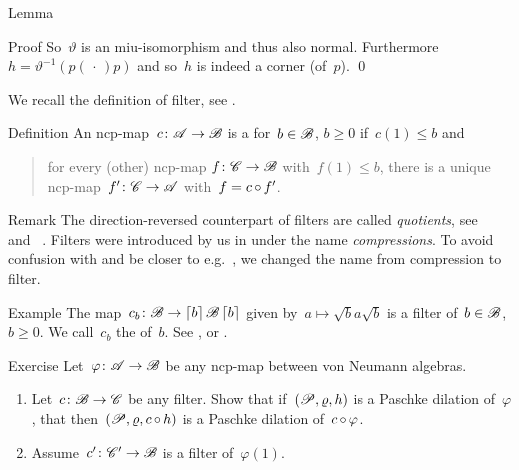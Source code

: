 \documentclass[b]{subfiles}
\begin{document}
\begin{parsec}
\begin{point}{Lemma}
\begin{point}{Proof}
So~$\vartheta$ is an miu-isomorphism and thus also normal.
    Furthermore~$h = \vartheta^{-1}(p (\,\cdot\,) p)$
     and so~$h$ is indeed a corner (of~$p$). \qed
\end{point}
\end{point}
\begin{point}%
We recall the definition of filter, see . 
\end{point}
\begin{point}{Definition}%
An ncp-map~$c \colon \mathscr{A} \to \mathscr{B}$
is a  for~$b \in\mathscr{B}$, $b \geq 0$ if~$c(1)\leq b$
    and
    \begin{quote}
        for every (other) ncp-map $f\colon \mathscr{C} \to \mathscr{B}$
            with~$f(1) \leq b$,
            there is a unique ncp-map~$f'\colon \mathscr{C} \to \mathscr{A}$
            with~$f = c \mathop{\circ} f'$.
    \end{quote}
\begin{point}{Remark}%
The direction-reversed counterpart
    of filters are called \emph{quotients},
    see~ and~\cite{effintro} .
Filters were introduced by us in \cite[Dfn.~2]{westerbaan2016universal}
    under the name \emph{compressions}.
To avoid confusion with \cite{alfsen2012}
    and be closer to e.g.~\cite{wilce2016royal},
    we changed the name from compression to filter.
\end{point}
\end{point}
\begin{point}{Example}%
    The map~$c_b\colon \mathscr{B} \to \left\lceil b\right\rceil \mathscr{B} \left\lceil b\right\rceil$
        given by~$a \mapsto \sqrt{b} a \sqrt{b}$ is a filter
        of~$b\in \mathscr{B}$, $b\geq 0$.
        We call~$c_b$ the  of~$b$.
    See , 
        or \cite[Prop.~6]{westerbaan2016universal}.
\end{point}
\begin{point}{Exercise}%
Let~$\varphi\colon \mathscr{A} \to \mathscr{B}$ be any ncp-map
    between von Neumann algebras.
\begin{enumerate}
\item
    Let~$c \colon \mathscr{B} \to \mathscr{C}$ be any filter.
    Show that if~$(\mathscr{P}, \varrho, h)$ is a Paschke dilation
            of~$\varphi$,
    that then~$(\mathscr{P}, \varrho, c \mathop{\circ} h)$ is a Paschke dilation
        of~$c \mathop{\circ} \varphi$.
\item
    Assume~$c'\colon \mathscr{C}' \to \mathscr{B}$ is a filter of~$\varphi(1)$.

\end{enumerate}
\end{point}
\end{parsec}
\end{document}
